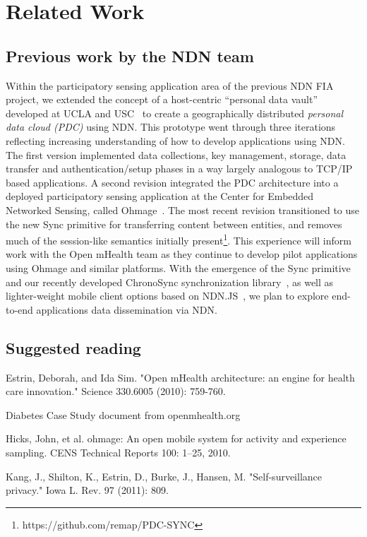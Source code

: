 \section{Related Work}

\subsection{Previous work by the NDN team}

Within the participatory sensing application area of the previous NDN
FIA project, we extended the concept of a host-centric ``personal data
vault'' developed at UCLA and USC~\cite{mun2010personal} to create a
geographically distributed \emph{personal data cloud (PDC)} using NDN.
This prototype went through three iterations reflecting increasing
understanding of how to develop applications using NDN.   The first
version implemented data collections, key management, storage, data
transfer and authentication/setup phases in a way largely analogous to
TCP/IP based applications.  A second revision integrated the PDC
architecture into a deployed participatory sensing application at the
Center for Embedded Networked Sensing, called
Ohmage~\cite{ramanathan2012ohmage}.
The most recent revision transitioned to use the
new Sync primitive for transferring content between entities, and removes
much of the session-like semantics initially
present\footnote{https://github.com/remap/PDC-SYNC}. This experience
will inform work with the Open mHealth team as they continue to develop
pilot applications using Ohmage and similar platforms. With the emergence
of the Sync primitive and our recently developed
ChronoSync synchronization library~\cite{Afanasyev13:CHRONOSYNC}, as well as lighter-weight mobile client
options based on NDN.JS~\cite{ndn-js-NOMEN}, we plan to explore end-to-end applications data dissemination via NDN.


\subsection{Suggested reading}

Estrin, Deborah, and Ida Sim. "Open mHealth architecture: an engine for health care innovation." Science 330.6005 (2010): 759-760.

Diabetes Case Study document from openmhealth.org 

Hicks, John, et al. ohmage: An open mobile system for activity and experience sampling. CENS Technical Reports 100: 1–25, 2010.

Kang, J., Shilton, K., Estrin, D., Burke, J., Hansen, M. "Self-surveillance privacy." Iowa L. Rev. 97 (2011): 809.
